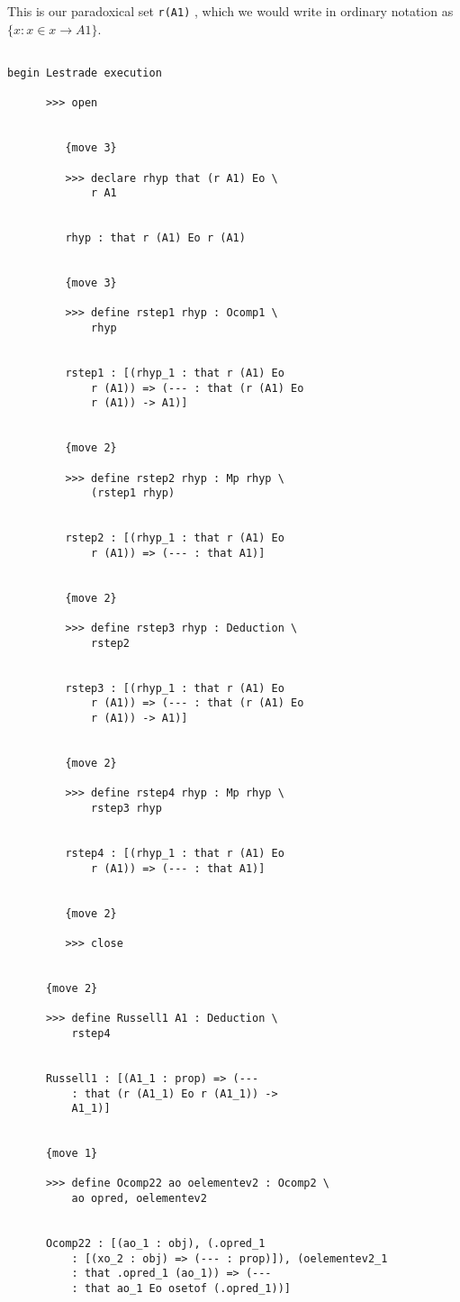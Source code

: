 \documentclass[12pt]{article}
\begin{document}
This is our paradoxical set {\tt r(A1)} , which we would write in ordinary notation as $\{x : x \in x \rightarrow A1\}$.


\begin{verbatim}

begin Lestrade execution

      >>> open


         {move 3}

         >>> declare rhyp that (r A1) Eo \
             r A1


         rhyp : that r (A1) Eo r (A1)


         {move 3}

         >>> define rstep1 rhyp : Ocomp1 \
             rhyp


         rstep1 : [(rhyp_1 : that r (A1) Eo 
             r (A1)) => (--- : that (r (A1) Eo 
             r (A1)) -> A1)]


         {move 2}

         >>> define rstep2 rhyp : Mp rhyp \
             (rstep1 rhyp)


         rstep2 : [(rhyp_1 : that r (A1) Eo 
             r (A1)) => (--- : that A1)]


         {move 2}

         >>> define rstep3 rhyp : Deduction \
             rstep2


         rstep3 : [(rhyp_1 : that r (A1) Eo 
             r (A1)) => (--- : that (r (A1) Eo 
             r (A1)) -> A1)]


         {move 2}

         >>> define rstep4 rhyp : Mp rhyp \
             rstep3 rhyp


         rstep4 : [(rhyp_1 : that r (A1) Eo 
             r (A1)) => (--- : that A1)]


         {move 2}

         >>> close


      {move 2}

      >>> define Russell1 A1 : Deduction \
          rstep4


      Russell1 : [(A1_1 : prop) => (--- 
          : that (r (A1_1) Eo r (A1_1)) -> 
          A1_1)]


      {move 1}

      >>> define Ocomp22 ao oelementev2 : Ocomp2 \
          ao opred, oelementev2


      Ocomp22 : [(ao_1 : obj), (.opred_1 
          : [(xo_2 : obj) => (--- : prop)]), (oelementev2_1 
          : that .opred_1 (ao_1)) => (--- 
          : that ao_1 Eo osetof (.opred_1))]



\end{verbatim}
\end{document}
